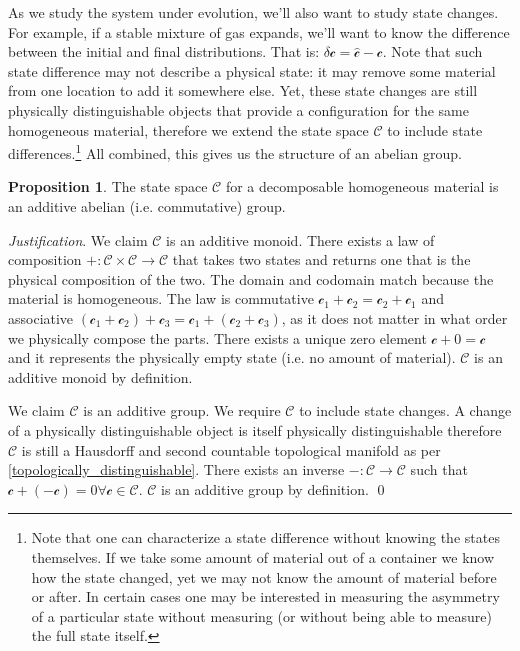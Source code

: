 \documentclass[aps,pra,10pt,twocolumn,floatfix,nofootinbib]{revtex4-1}
\numberwithin{equation}{section}
\theoremstyle{definition}
\newtheorem{prop}[equation]{Proposition}
\newenvironment{justification}{\emph{Justification}.}{\qed}
\begin{document}
As we study the system under evolution, we'll also want to study state changes. For example, if a stable mixture of gas expands, we'll want to know the difference between the initial and final distributions. That is: $\delta\mathcal{c}=\hat{\mathcal{c}}-\mathcal{c}$. Note that such state difference may not describe a physical state: it may remove some material from one location to add it somewhere else. Yet, these state changes are still physically distinguishable objects that provide a configuration for the same homogeneous material, therefore we extend the state space $\mathcal{C}$ to include state differences.\footnote{Note that one can characterize a state difference without knowing the states themselves. If we take some amount of material out of a container we know how the state changed, yet we may not know the amount of material before or after. In certain cases one may be interested in measuring the asymmetry of a particular state without measuring (or without being able to measure) the full state itself.} All combined, this gives us the structure of an abelian group.

\begin{prop}\label{prop:abelian_group}
The state space $\mathcal{C}$ for a decomposable homogeneous material is an additive abelian (i.e. commutative) group.
\end{prop}

\begin{justification}
We claim $\mathcal{C}$ is an additive monoid. There exists a law of composition $+ : \mathcal{C} \times \mathcal{C} \rightarrow \mathcal{C}$ that takes two states and returns one that is the physical composition of the two. The domain and codomain match because the material is homogeneous. The law is commutative $\mathcal{c}_1 +\mathcal{c}_2 = \mathcal{c}_2+\mathcal{c}_1$ and associative $(\mathcal{c}_1 + \mathcal{c}_2) + \mathcal{c}_3 = \mathcal{c}_1 + (\mathcal{c}_2 + \mathcal{c}_3)$, as it does not matter in what order we physically compose the parts. There exists a unique zero element $\mathcal{c} + 0 = \mathcal{c}$ and it represents the physically empty state (i.e. no amount of material). $\mathcal{C}$ is an additive monoid by definition.

We claim $\mathcal{C}$ is an additive group. We require $\mathcal{C}$ to include state changes. A change of a physically distinguishable object is itself physically distinguishable therefore $\mathcal{C}$ is still a Hausdorff and second countable topological manifold as per \ref{topologically_distinguishable}. There exists an inverse $- : \mathcal{C} \rightarrow \mathcal{C}$ such that $\mathcal{c} + ( - \mathcal{c}) = 0 \forall \mathcal{c} \in \mathcal{C}$. $\mathcal{C}$ is an additive group by definition. 
\end{justification}
\end{document}
